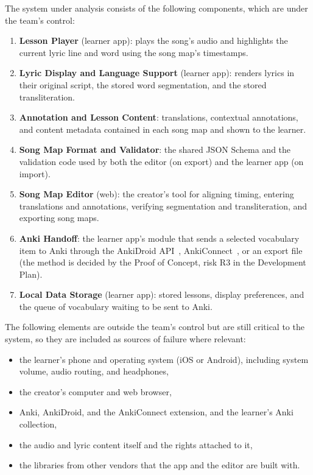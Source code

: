 \documentclass{article}
\begin{document}
The system under analysis consists of the following components, which are
under the team's control:

\begin{enumerate}
  \item \textbf{Lesson Player} (learner app): plays the song's audio and
        highlights the current lyric line and word using the song map's
        timestamps.
  \item \textbf{Lyric Display and Language Support} (learner app): renders
        lyrics in their original script, the stored word segmentation, and the
        stored transliteration.
  \item \textbf{Annotation and Lesson Content}: translations, contextual
        annotations, and content metadata contained in each song map and
        shown to the learner.
  \item \textbf{Song Map Format and Validator}: the shared JSON Schema and the
        validation code used by both the editor (on export) and the learner
        app (on import).
  \item \textbf{Song Map Editor} (web): the creator's tool for aligning timing,
        entering translations and annotations, verifying segmentation and
        transliteration, and exporting song maps.
  \item \textbf{Anki Handoff}: the learner app's module that sends a selected
        vocabulary item to Anki through the AnkiDroid API~\cite{AnkiDroidAPI},
        AnkiConnect~\cite{AnkiConnect}, or an export file (the method is decided by the Proof of Concept, risk R3 in
        the Development Plan).
  \item \textbf{Local Data Storage} (learner app): stored lessons, display
        preferences, and the queue of vocabulary waiting to be sent to Anki.
\end{enumerate}

The following elements are outside the team's control but are still critical
to the system, so they are included as sources of failure where relevant:

\begin{itemize}
  \item the learner's phone and operating system (iOS or Android), including
        system volume, audio routing, and headphones,
  \item the creator's computer and web browser,
  \item Anki, AnkiDroid, and the AnkiConnect extension, and the learner's Anki
        collection,
  \item the audio and lyric content itself and the rights attached to it,
  \item the libraries from other vendors that the app and the editor are
        built with.
\end{itemize}
\end{document}
